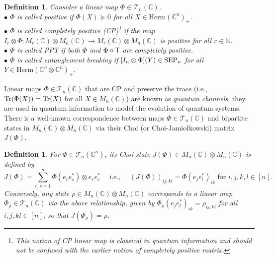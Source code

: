 \documentclass[11pt]{article}
\newcommand{\N}{\ensuremath{\mathbb{N}}}   %
\newcommand{\C}{\ensuremath{\mathbb{C}}} %
\newcommand{\MT}{{\mathcal T}}
\newcommand{\Herm}{\mathrm{Herm}}
\newcommand{\SEP}{\text{\rm SEP}}
\newcommand{\Tr}{\text{\rm Tr}}
\newcommand{\ot}{\otimes}
\theoremstyle{plain}
\newtheorem{definition}[satz]{Definition}
\newcommand{\ML}{\textcolor{blue}}
\begin{document}
\begin{definition}
Consider a linear map   $\Phi\in\mathcal{T}_n(\C)$. %
\\
$\bullet$ $\Phi$  is called {\em positive} if $\Phi(X)\succeq0$ for all $X\in\Herm(\C^n)_+$.\\
$\bullet$  $\Phi$ is called {\em completely positive} (CP)\footnote{This notion of CP linear map is classical in quantum information and should not be confused with the earlier notion of completely positive matrix.} if the map 
$I_r\ot\Phi:M_r(\C)\ot M_n(\C)\to M_r(\C)\ot M_n(\C)$   is positive for all $r\in\N$.\\
 $\bullet$   $\Phi$ is  called  {\em PPT} if both $\Phi$ and $\Phi\circ \sf T$ are  completely positive.\\
 $\bullet$   $\Phi$ is called {\em entanglement breaking} if  $[I_n\ot \Phi](Y)\in\SEP_n$ for all $Y\in \Herm(\C^n\ot\C^n)_+$.
\end{definition}

Linear maps $\Phi\in\MT_n(\C)$ that are CP and preserve the trace (i.e., $\Tr(\Phi(X))=\Tr(X)$ for all $X\in M_n(\C)$) are known as {\em quantum channels}, they are used   in quantum information to  model the evolution of quantum systems. 
There is a  well-known correspondence between  maps $\Phi\in\MT_n(\C)$ and bipartite states in  $M_n(\C)\ot M_n(\C)$ via their   Choi (or Choi-Jamio\l kowski) matrix $J(\Phi)$.

\begin{definition}\label{def:Choimatrix}
For  $\Phi\in\mathcal{T}_n(\C^n)$,   its   Choi state $J(\Phi)\in M_n(\C)\ot M_n(\C)$ is defined by 
$$J(\Phi)=\sum_{r,s=1}^n\Phi(e_r e_s^*)\ot e_r e_s^* \quad \text{ i.e., }\quad 
(J(\Phi))_{ij,kl}= \Phi(e_je_l^*)_{ik} \text{ for } i,j,k,l\in [n].$$
Conversely, any state $\rho\in M_n(\C)\ot M_n(\C)$ corresponds to a linear map $\Phi_\rho \in\MT_n(\C)$ via the above relationship, given by $\Phi_\rho(e_je_l^*)_{ik}=\rho_{ij,kl}$ for all $i,j,kl\in [n]$, so that $J(\Phi_\rho)=\rho$.
\end{definition}
\end{document}
